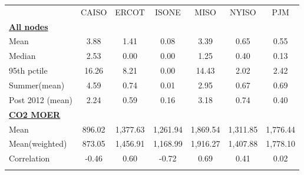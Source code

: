 \begin{center}
\begin{tabular}{lcccccc}
\hline \noalign{\smallskip} & CAISO & ERCOT & ISONE & MISO & NYISO & PJM\\
\noalign{\smallskip}\hline \noalign{\smallskip}\textbf{\underline{All nodes}} &  &  &  &  &  & \\
Mean & 3.88 & 1.41 & 0.08 & 3.39 & 0.65 & 0.55\\
Median & 2.53 & 0.00 & 0.00 & 1.25 & 0.40 & 0.13\\
95th pctile & 16.26 & 8.21 & 0.00 & 14.43 & 2.02 & 2.42\\
Summer(mean) & 4.59 & 0.74 & 0.01 & 2.95 & 0.67 & 0.69\\
Post 2012 (mean) & 2.24 & 0.59 & 0.16 & 3.18 & 0.74 & 0.40\\
\textbf{\underline{CO2 MOER}} &  &  &  &  &  & \\
Mean & 896.02 & 1,377.63 & 1,261.94 & 1,869.54 & 1,311.85 & 1,776.44\\
Mean(weighted) & 873.05 & 1,456.91 & 1,168.99 & 1,916.27 & 1,407.88 & 1,778.10\\
Correlation & -0.46 & 0.60 & -0.72 & 0.69 & 0.41 & 0.02\\
\noalign{\smallskip}\hline\end{tabular}\\
\end{center}
